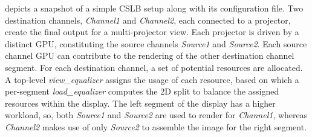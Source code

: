  depicts a snapshot of a simple CSLB setup along with its
configuration file. Two destination channels, {\em Channel1} and {\em
Channel2}, each connected to a projector, create the final output for a
multi-projector view. Each projector is driven by a distinct GPU, constituting
the source channels {\em Source1} and {\em Source2}. Each source channel GPU
can contribute to the rendering of the other destination channel segment. For
each destination channel, a set of potential resources are allocated. A
top-level {\em view\_equalizer} assigns the usage of each resource, based on
which a per-segment {\em load\_equalizer} computes the 2D split to balance the
assigned resources within the display. The left segment of the display has a
higher workload, so, both {\em Source1} and {\em Source2} are used to render
for {\em Channel1}, whereas {\em Channel2} makes use of only {\em Source2} to
assemble the image for the right segment.

